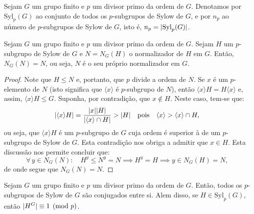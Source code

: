 \begin{definition}
  Sejam $G$ um grupo finito e $p$ um divisor primo da ordem de $G$. Denotamos por $\text{Syl}_{p}(G)$ ao conjunto de todos os $p$-subgrupos de Sylow de $G$, e por $n_{p}$ ao número de $p$-subgrupos de Sylow de $G$, isto é, $n_{p}=\lvert\text{Syl}_{p}(G)\rvert$.
\end{definition}

\begin{proposition}\label{prop:normalizadores-de-p-subgrupos-de-sylow}
  Sejam $G$ um grupo finito e $p$ um divisor primo da ordem de $G$. Sejam $H$ um $p$-subgrupo de Sylow de $G$ e $N=N_{G}(H)$ o normalizador de $H$ em $G$. Então, $N_{G}(N)=N$, ou seja, $N$ é o seu próprio normalizador em $G$.
\end{proposition}

\begin{proof}
  Note que $H\leqslant{N}$ e, portanto, que $p$ divide a ordem de $N$. Se $x$ é um $p$-elemento de $N$ (isto significa que $\langle{x}\rangle$ é $p$-subgrupo de $N$), então $\langle{x}\rangle{H}=H\langle{x}\rangle$ e, assim, $\langle{x}\rangle{H}\leqslant{G}$. Suponha, por contradição, que $x\notin{H}$. Neste caso, tem-se que:
  \[
    \lvert\langle{x}\rangle{H}\rvert=\frac{\lvert x\rvert\lvert H\rvert}{\lvert\langle{x}\rangle\cap{H}\rvert}>\lvert H\rvert\quad\text{pois}\quad\langle{x}\rangle>\langle{x}\rangle\cap{H},
  \]
  ou seja, que $\langle{x}\rangle{H}$ é um $p$-subgrupo de $G$ cuja ordem é superior à de um $p$-subgrupo de Sylow de $G$. Esta contradição nos obriga a admitir que $x\in{H}$. Esta discussão nos permite concluir que:
  \[
    \forall\,y\in{N_{G}(N)}:\quad{H^{y}\leqslant{N^{y}=N}\implies{H^{y}=H}\implies{y\in{N_{G}(H)=N}}},
  \]
  de onde segue que $N_{G}(N)=N$.
\end{proof}

\begin{theorem}[Sylow]\label{thm:segundo-teorema-de-sylow}
  Sejam $G$ um grupo finito e $p$ um divisor primo da ordem de $G$. Então, todos os $p$-subgrupos de Sylow de $G$ são conjugados entre si. Alem disso, se $H\in\text{Syl}_{p}(G)$, então $\lvert H^{G}\rvert\equiv{1}\pmod{p}$.
\end{theorem}

